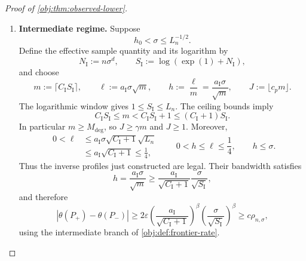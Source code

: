 \begin{proof}[Proof of \cref{obj:thm:observed-lower}]
\begin{enumerate}
To control the sample budget, define
\[
\lambda:=\frac{\ell^2}{\sigma^2}>0.
\]
Whenever \(J\ge1\) and \(J\ge2\lambda\), consecutive factorial-series terms have ratio at most \(1/2\). Induction therefore gives
\[
\frac{\lambda^{J+k}}{(J+k)!}
\le\frac{\lambda^J}{J!}\,2^{-k}
\quad(k\in\mathbb N_0),
\qquad
\mathcal T_{\sigma,\ell,J}
\le2\frac{\lambda^J}{J!}.
\]
The nonnegative exponential series gives
\[
\frac{J^J}{J!}
\le\sum_{k=0}^\infty\frac{J^k}{k!}
=\exp(J).
\]
Multiplication by \((\lambda/J)^J\) yields
\[
\frac{\lambda^J}{J!}
\le\left(\frac{\exp(1)\lambda}{J}\right)^J,
\qquad
\mathcal T_{\sigma,\ell,J}
\le2\left(\frac{\exp(1)\lambda}{J}\right)^J.
\]
Finally, whenever \(h\le\sigma\),
\[
\sigma^{-\kappa-1}h^{2\beta+2\kappa+2}
=
h^d(h/\sigma)^{\kappa+1}
\le h^d.
\]

\item \textbf{Intermediate regime.}
Suppose
\[
h_0<\sigma\le L_n^{-1/2}.
\]
Define the effective sample quantity and its logarithm by
\[
N_{\mathrm I}:=n\sigma^d,\qquad
S_{\mathrm I}:=\log(\exp(1)+N_{\mathrm I}),
\]
and choose
\[
m:=\lceil C_{\mathrm I}S_{\mathrm I}\rceil,\qquad
\ell:=a_{\mathrm I}\sigma\sqrt m,\qquad
h:=\frac{\ell}{m}=\frac{a_{\mathrm I}\sigma}{\sqrt m},
\qquad
J:=\lfloor c_pm\rfloor.
\]
The logarithmic window gives \(1\le S_{\mathrm I}\le L_n\). The ceiling bounds imply
\[
C_{\mathrm I}S_{\mathrm I}\le m
<C_{\mathrm I}S_{\mathrm I}+1
\le(C_{\mathrm I}+1)S_{\mathrm I}.
\]
In particular \(m\ge M_{\mathrm{deg}}\), so \(J\ge\gamma m\) and \(J\ge1\). Moreover,
\[
\begin{aligned}
0<\ell
&\le a_{\mathrm I}\sigma
\sqrt{C_{\mathrm I}+1}\sqrt{L_n}\\
&\le a_{\mathrm I}\sqrt{C_{\mathrm I}+1}
\le\frac14,
\end{aligned}
\qquad
0<h\le\ell\le\frac14,\qquad h\le\sigma.
\]
Thus the inverse profiles just constructed are legal. Their bandwidth satisfies
\[
h=\frac{a_{\mathrm I}\sigma}{\sqrt m}
\ge
\frac{a_{\mathrm I}}{\sqrt{C_{\mathrm I}+1}}
\frac{\sigma}{\sqrt{S_{\mathrm I}}},
\]
and therefore
\[
|\theta(P_+)-\theta(P_-)|
\ge
2\varepsilon
\left(\frac{a_{\mathrm I}}{\sqrt{C_{\mathrm I}+1}}\right)^\beta
\left(\frac{\sigma}{\sqrt{S_{\mathrm I}}}\right)^\beta
\ge c\rho_{n,\sigma},
\]
using the intermediate branch of \cref{obj:def:frontier-rate}.


\end{enumerate}
\end{proof}
